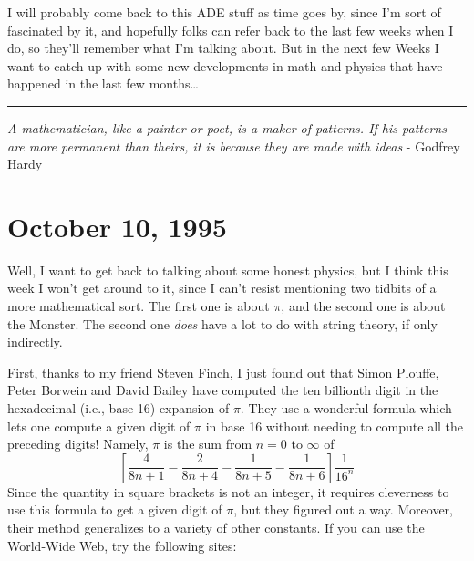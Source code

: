 \documentclass{article}
\renewcommand{\texttt}[1]{%
  \begingroup
  \ttfamily
  \begingroup\lccode`~=`/\lowercase{\endgroup\def~}{/\discretionary{}{}{}}%
  \begingroup\lccode`~=`[\lowercase{\endgroup\def~}{[\discretionary{}{}{}}%
  \begingroup\lccode`~=`.\lowercase{\endgroup\def~}{.\discretionary{}{}{}}%
  \catcode`/=\active\catcode`[=\active\catcode`.=\active
  \scantokens{#1\noexpand}%
  \endgroup
}
\begin{document}
I will probably come back to this ADE stuff as time goes by, since I'm
sort of fascinated by it, and hopefully folks can refer back to the last
few weeks when I do, so they'll remember what I'm talking about. But in
the next few Weeks I want to catch up with some new developments in math
and physics that have happened in the last few months\ldots{}

\begin{center}\rule{0.5\linewidth}{0.5pt}\end{center}

\emph{A mathematician, like a painter or poet, is a maker of patterns.
If his patterns are more permanent than theirs, it is because they are
made with ideas} - Godfrey Hardy



\hypertarget{week66}{%
\section{October 10, 1995}\label{week66}}

Well, I want to get back to talking about some honest physics, but I
think this week I won't get around to it, since I can't resist
mentioning two tidbits of a more mathematical sort. The first one is
about \(\pi\), and the second one is about the Monster. The second one
\emph{does} have a lot to do with string theory, if only indirectly.

First, thanks to my friend Steven Finch, I just found out that Simon
Plouffe, Peter Borwein and David Bailey have computed the ten billionth
digit in the hexadecimal (i.e., base 16) expansion of \(\pi\). They use
a wonderful formula which lets one compute a given digit of \(\pi\) in
base 16 without needing to compute all the preceding digits! Namely,
\(\pi\) is the sum from \(n = 0\) to \(\infty\) of \[
  \left[
    \frac{4}{8n+1} -\frac{2}{8n+4} -\frac{1}{8n+5} -\frac{1}{8n+6}
  \right] \frac{1}{16^n}
\] Since the quantity in square brackets is not an integer, it requires
cleverness to use this formula to get a given digit of \(\pi\), but they
figured out a way. Moreover, their method generalizes to a variety of
other constants. If you can use the World-Wide Web, try the following
sites:

\end{document}
